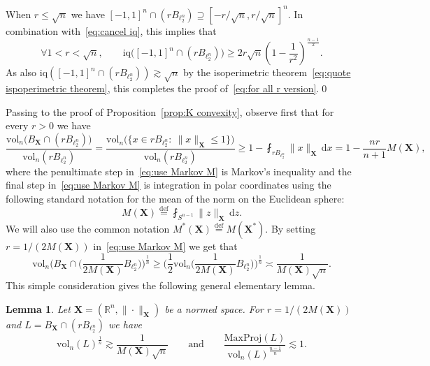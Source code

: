\documentclass[11pt,reqno]{amsart}
\renewcommand{\le}{\leqslant}
\renewcommand{\ge}{\geqslant}
\newcommand{\ud}[0]{\,\mathrm{d}}
\newcommand{\X}{\mathbf X}
\newcommand{\R}{\mathbb R}
\newtheorem{lemma}[theorem]{Lemma}
\theoremstyle{remark}
\newcommand{\iq}{\mathrm{iq}}
\newcommand{\eqdef}{\stackrel{\mathrm{def}}{=}}
\newcommand{\vol}{\mathrm{vol}}
\renewcommand{\1}{\mathbf 1}
\begin{document}
When $r\le \sqrt{n}$ we have $[-1,1]^n\cap (rB_{\ell_2^n})\supseteq [-r/\sqrt{n},r/\sqrt{n}]^n$. In combination with~\eqref{eq:cancel iq}, this implies that
$$
\forall 1<r<\sqrt{n},\qquad \iq\big([-1,1]^n\cap (rB_{\ell_2^n})\big)\ge 2r\sqrt{n}\left(1-\frac{1}{r^2}\right)^{\frac{n-1}{2}}.
$$
As also $\iq([-1,1]^n\cap (rB_{\ell_2^n}))\gtrsim \sqrt{n}$ by the isoperimetric theorem~\eqref{eq:quote ispoperimetric theorem}, this completes the proof of~\eqref{eq:for all r version}.\qed

\medskip

Passing to the proof of Proposition~\ref{prop:K convexity}, observe first that for every $r>0$ we have
\begin{equation}\label{eq:use Markov M}
\frac{\vol_n\big(B_\X\cap (rB_{\ell_2^n})\big)}{\vol_n(rB_{\ell_2^n})}= \frac{\vol_n \big(\{x\in rB_{\ell_2^n}:\ \|x\|_\X\le 1\}\big)}{\vol_n(rB_{\ell_2^n})}\ge 1-\fint_{rB_{\ell_2^n}} \|x\|_\X\ud x=1-\frac{nr}{n+1}M(\X),
\end{equation}
where the penultimate step in~\eqref{eq:use Markov M} is  Markov's inequality and the final step in~\eqref{eq:use Markov M} is integration in polar coordinates using the following standard notation for the mean of the norm on the Euclidean sphere:
\begin{equation}\label{eq:def M average}
M(\X)\eqdef \fint_{S^{n-1}} \|z\|_\X\ud z.
\end{equation}
We will also use the common notation $M^*(\X)\eqdef M(\X^*)$. By setting  $r=1/(2M(\X))$ in~\eqref{eq:use Markov M}  we get that
\begin{equation}\label{eq:markov used for volume lower bound}
\vol_n\bigg(B_\X\cap \Big(\frac{1}{2M(\X)}B_{\ell_2^n}\Big)\bigg)^{\frac{1}{n}}\ge \bigg(\frac12 \vol_n\Big(\frac{1}{2M(\X)}B_{\ell_2^n}\Big)\bigg)^{\frac{1}{n}}\asymp \frac{1}{M(\X)\sqrt{n}}.
\end{equation}
This simple consideration gives the following general elementary lemma. 
\begin{lemma}\label{lem:use markov for intersection with ball} Let $\X=(\R^n,\|\cdot\|_\X)$ be a normed space. For $r=1/(2M(\X))$ and $L= B_\X\cap (r B_{\ell_2^n})$ we have
\begin{equation}\label{eq:maxprojL}
\vol_n(L)^{\frac{1}{n}}\gtrsim \frac{1}{M(\X)\sqrt{n}}\qquad\mathrm{and} \qquad \frac{\mathrm{MaxProj}(L) }{\vol_n(L)^{\frac{n-1}{n}}}\lesssim 1. 
\end{equation}
\end{lemma}
\end{document}
